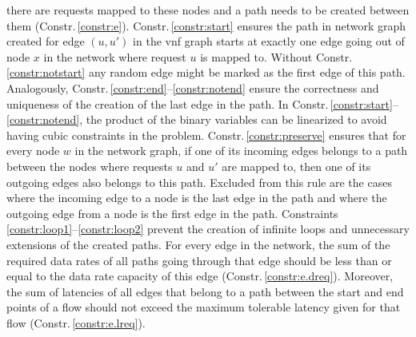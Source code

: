 \documentclass[10pt,a4paper,conference]{IEEEtran}
\begin{document}
there are requests mapped to these nodes and a path needs to be created 
between them (Constr.\,\ref{constr:e}). Constr.\,\ref{constr:start} ensures 
the path in network graph created for edge $ (u,u') $ in the \ac{vnf} graph starts 
at exactly one edge going out of node $ x $ in the network where request $ u $ is mapped
to. Without Constr.\,\ref{constr:notstart} any random edge might be marked as 
the first edge of this path. Analogously, Constr.\,\ref{constr:end}--\ref{constr:notend}
ensure the correctness and uniqueness of the creation of the last edge in the path.
In Constr.\,\ref{constr:start}--\ref{constr:notend}, the product of the binary
variables can be linearized to avoid having cubic constraints in the problem.
Constr.\,\ref{constr:preserve} ensures that for every node $ w $ in the network 
graph, if one of its incoming edges belongs to a path between the nodes where 
requests $ u $ and $ u' $ are mapped to, then one of its outgoing edges also 
belongs to this path. Excluded from this rule are the cases where the incoming 
edge to a node is the last edge in the path and where the outgoing edge from a 
node is the first edge in the path. Constraints \ref{constr:loop1}--\ref{constr:loop2}
prevent the creation of infinite loops and unnecessary extensions of the created paths.
For every edge in the network, the sum of the required data rates of all paths going
through that edge should be less than or equal to the data rate capacity of this edge (Constr.\,\ref{constr:e.dreq}).
Moreover, the sum of latencies of all edges that belong to a path between the start 
and end points of a flow should not exceed the maximum tolerable latency given for that flow
(Constr.\,\ref{constr:e.lreq}).
\end{document}
